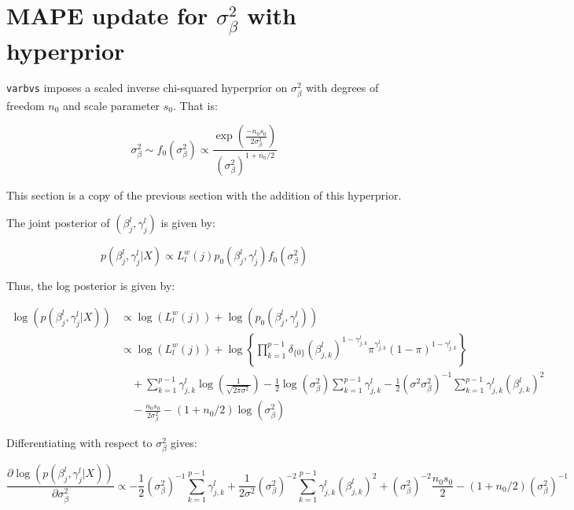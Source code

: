 \documentclass[twoside]{article}
\newcommand{\1}{\\[1ex]}
\newcommand{\2}{\\[2ex]}
\newcommand{\3}{\\[3ex]}
\newcommand{\4}{\\[4ex]}
\begin{document}
\section{MAPE update for $\sigma_\beta^2$ with hyperprior}

\texttt{varbvs} imposes a scaled inverse chi-squared hyperprior on $\sigma^2_\beta$ with degrees of freedom $n_0$ and scale parameter $s_0$. That is:

\begin{equation}
\sigma^2_\beta \sim f_0(\sigma^2_\beta) \propto \frac{\exp\left(\frac{-n_0s_0}{2\sigma^2_\beta}\right)}{{(\sigma^2_\beta)^{1 + n_0/2}}}
\end{equation}

This section is a copy of the previous section with the addition of this hyperprior. 

The joint posterior of $(\beta_j^l,\gamma_j^l)$ is given by:

\begin{equation}
p(\beta_j^l,\gamma_j^l|X)\propto L_l^w(j)p_0(\beta_j^l, \gamma_j^l)f_0(\sigma^2_\beta)
\end{equation}

Thus, the log posterior is given by:

\begin{align}
\log(p(\beta_j^l,\gamma_j^l|X)) & \propto \log(L_l^w(j)) + \log(p_0(\beta_j^l, \gamma_j^l))  \\
& \propto \log(L_l^w(j)) + \log\left\{\prod_{k = 1}^{p - 1}\delta_{\{0\}}\left(\beta_{j,k}^l\right)^{1- \gamma_{j,k}^l}\pi^{\gamma_{j,k}^l}(1-\pi)^{1-\gamma_{j,k}^l}\right\}\\
& \quad + \sum_{k = 1}^{p-1}\gamma_{j,k}^l\log(\frac1{\sqrt{2\pi\sigma^2}}) -\frac12\log(\sigma^2_\beta) \sum_{k = 1}^{p-1}\gamma_{j,k}^l - \frac12(\sigma^2\sigma^2_\beta)^{-1}\sum_{k=1}^{p-1}\gamma_{j,k}^l(\beta_{j,k}^l)^2 \\
&\quad -\frac{n_0s_0}{2\sigma^2_\beta}-(1 + n_0/2)\log(\sigma^2_\beta)
\end{align}

Differentiating with respect to $\sigma^2_\beta$ gives:

\begin{equation}
\frac{\partial\log(p(\beta_j^l,\gamma_j^l|X))}{\partial\sigma^2_\beta}\propto -\frac12(\sigma^2_\beta)^{-1} \sum_{k = 1}^{p-1}\gamma_{j,k}^l + \frac1{2\sigma^2}(\sigma^2_\beta)^{-2}\sum_{k=1}^{p-1}\gamma_{j,k}^l(\beta_{j,k}^l)^2 +(\sigma^2_\beta)^{-2}\frac{n_0s_0}{2}-(1 + n_0/2)(\sigma^2_\beta)^{-1}
\end{equation}
\end{document}

